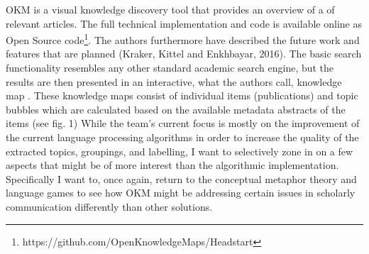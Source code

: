OKM is a visual knowledge discovery tool that provides an overview of a of relevant
articles. The full technical implementation and code is available online
as Open Source code\footnote{https://github.com/OpenKnowledgeMaps/Headstart}.
The authors furthermore have described the future work and features that
are planned (Kraker, Kittel and Enkhbayar, 2016). The basic search
functionality resembles any other standard academic search engine, but
the results are then presented in an interactive, what the authors call,
knowledge map . These knowledge maps consist of individual items
(publications) and topic bubbles which are calculated based on the
available metadata abstracts of the items (see fig. 1) While the team’s
current focus is mostly on the improvement of the current language
processing algorithms in order to increase the quality of the extracted
topics, groupings, and labelling, I want to selectively zone in on a few
aspects that might be of more interest than the algorithmic
implementation. Specifically I want to, once again, return to the
conceptual metaphor theory and language games to see how
OKM might be addressing certain issues in scholarly communication
differently than other solutions.
